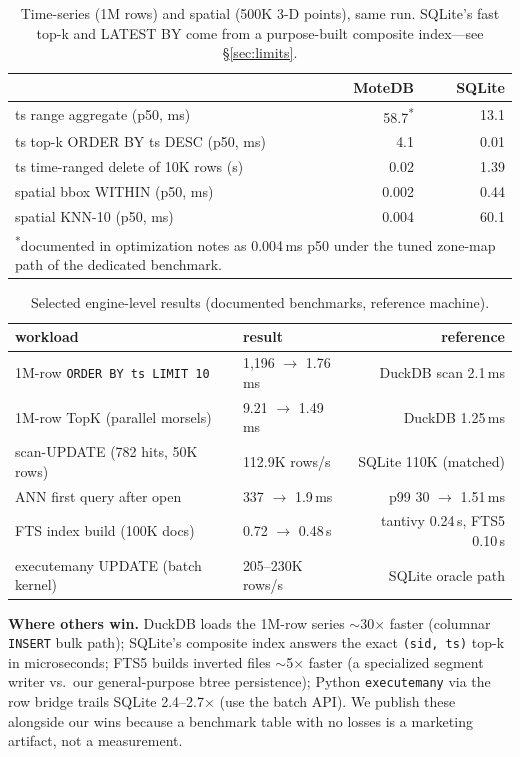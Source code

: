 \documentclass[10pt]{article}
\begin{document}
\begin{table}[h]
\centering\small
\caption{Time-series (1M rows) and spatial (500K 3-D points), same run.
SQLite's fast top-k and LATEST BY come from a purpose-built composite
index---see \S\ref{sec:limits}.}
\begin{tabular}{lrr}
\toprule
 & MoteDB & SQLite \\
\midrule
ts range aggregate (p50, ms) & 58.7\textsuperscript{*} & 13.1 \\
ts top-k ORDER BY ts DESC (p50, ms) & 4.1 & 0.01 \\
ts time-ranged delete of 10K rows (s) & 0.02 & 1.39 \\
spatial bbox WITHIN (p50, ms) & 0.002 & 0.44 \\
spatial KNN-10 (p50, ms) & 0.004 & 60.1 \\
\bottomrule
\multicolumn{3}{l}{\textsuperscript{*}\footnotesize documented in optimization notes as
0.004\,ms p50 under the tuned zone-map path of the dedicated benchmark.}
\end{tabular}
\end{table}

\begin{table}[h]
\centering\small
\caption{Selected engine-level results (documented benchmarks, reference
machine).}
\begin{tabular}{llr}
\toprule
workload & result & reference \\
\midrule
1M-row \texttt{ORDER BY ts LIMIT 10} & 1{,}196 $\to$ 1.76\,ms & DuckDB scan 2.1\,ms \\
1M-row TopK (parallel morsels) & 9.21 $\to$ 1.49\,ms & DuckDB 1.25\,ms \\
scan-UPDATE (782 hits, 50K rows) & 112.9K rows/s & SQLite 110K (matched) \\
ANN first query after open & 337 $\to$ 1.9\,ms & p99 30 $\to$ 1.51\,ms \\
FTS index build (100K docs) & 0.72 $\to$ 0.48\,s & tantivy 0.24\,s, FTS5 0.10\,s \\
executemany UPDATE (batch kernel) & 205--230K rows/s & SQLite oracle path \\
\bottomrule
\end{tabular}
\end{table}

\textbf{Where others win.} DuckDB loads the 1M-row series $\sim$30$\times$
faster (columnar \texttt{INSERT} bulk path); SQLite's composite index
answers the exact \texttt{(sid, ts)} top-k in microseconds; FTS5 builds
inverted files $\sim$5$\times$ faster (a specialized segment writer vs.\ our
general-purpose btree persistence); Python \texttt{executemany} via the
row bridge trails SQLite 2.4--2.7$\times$ (use the batch API). We publish
these alongside our wins because a benchmark table with no losses is a
marketing artifact, not a measurement.
\end{document}
